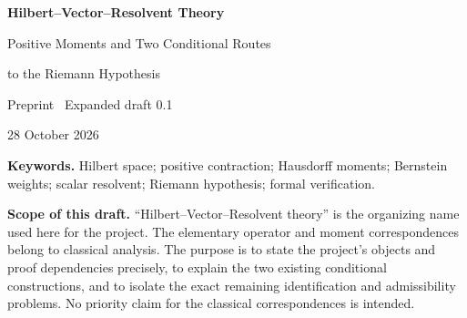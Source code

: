 \thispagestyle{plain}
\begin{center}
{\LARGE\bfseries Hilbert--Vector--Resolvent Theory\par}
\vspace{8pt}
{\large Positive Moments and Two Conditional Routes\par
to the Riemann Hypothesis\par}
\vspace{10pt}
Preprint \textperiodcentered\ Expanded draft 0.1\par
28 October 2026
\end{center}
\vspace{5pt}
\begin{abstract}
We develop an introductory framework connecting scalar coefficients,
distinguished vectors in Hilbert space, positive moment measures, and
analytic resolvents. For a positive contraction $T$ and a unit vector
$v$, the moments $\langle v,T^nv\rangle$ have nonnegative Bernstein
weights; conversely, normalized Bernstein positivity produces a
probability measure on $[0,1]$ and a concrete multiplication-operator
model. The associated scaled resolvent is holomorphic on a slit plane
and has nonpositive imaginary part in the upper half-plane. We give
the finite algebra, moment-limit construction, and analytic
continuation argument underlying this correspondence.

The arithmetic application concerns the actual normalized moments
of the centered Riemann $\xi$-function. Their universal zero-cancellation
condition, denoted $H00$, yields two conditional routes to the literal
Riemann hypothesis: one through spectral growth of Bernstein variation,
and one through a positive measure and its resolvent. The existing Lean
development proves both implications and the corresponding equivalences;
the present text supplies a broader mathematical exposition and a source
concordance. The concrete Hilbert-space packaging is presented as
classical mathematics, separately from the declarations already audited.
The hypothesis $H00$ itself remains unproved. Neither an unconditional
proof of the Riemann hypothesis nor a finite accepted certificate is
asserted.
\end{abstract}

\noindent\textbf{Keywords.} Hilbert space; positive contraction;
Hausdorff moments; Bernstein weights; scalar resolvent; Riemann
hypothesis; formal verification.

\medskip
\noindent\textbf{Scope of this draft.}
``Hilbert--Vector--Resolvent theory'' is the organizing name used here
for the project. The elementary operator and moment correspondences
belong to classical analysis. The purpose is to state the project's
objects and proof dependencies precisely, to explain the two existing
conditional constructions, and to isolate the exact remaining
identification and admissibility problems. No priority claim for the
classical correspondences is intended.

